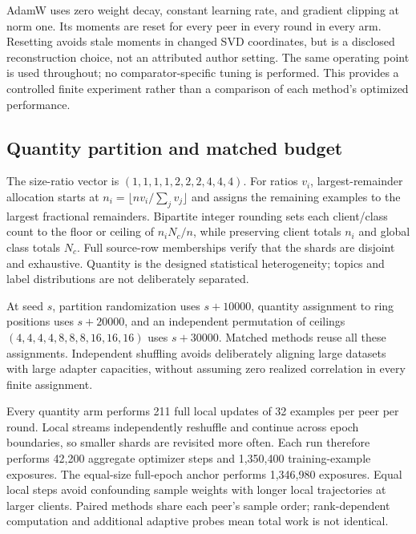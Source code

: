 \documentclass[11pt]{article}
\begin{document}
AdamW uses zero weight decay, constant learning rate, and gradient clipping at norm one. Its moments are reset for every peer in every round in every arm. Resetting avoids stale moments in changed SVD coordinates, but is a disclosed reconstruction choice, not an attributed author setting. The same operating point is used throughout; no comparator-specific tuning is performed. This provides a controlled finite experiment rather than a comparison of each method's optimized performance.

\subsection{Quantity partition and matched budget}
The size-ratio vector is $(1,1,1,1,2,2,2,4,4,4)$. For ratios $v_i$, largest-remainder allocation starts at $n_i=\lfloor nv_i/\sum_jv_j\rfloor$ and assigns the remaining examples to the largest fractional remainders. Bipartite integer rounding sets each client/class count to the floor or ceiling of $n_iN_c/n$, while preserving client totals $n_i$ and global class totals $N_c$. Full source-row memberships verify that the shards are disjoint and exhaustive. Quantity is the designed statistical heterogeneity; topics and label distributions are not deliberately separated.

At seed $s$, partition randomization uses $s+10000$, quantity assignment to ring positions uses $s+20000$, and an independent permutation of ceilings $(4,4,4,4,8,8,8,16,16,16)$ uses $s+30000$. Matched methods reuse all these assignments. Independent shuffling avoids deliberately aligning large datasets with large adapter capacities, without assuming zero realized correlation in every finite assignment.

Every quantity arm performs 211 full local updates of 32 examples per peer per round. Local streams independently reshuffle and continue across epoch boundaries, so smaller shards are revisited more often. Each run therefore performs 42,200 aggregate optimizer steps and 1,350,400 training-example exposures. The equal-size full-epoch anchor performs 1,346,980 exposures. Equal local steps avoid confounding sample weights with longer local trajectories at larger clients. Paired methods share each peer's sample order; rank-dependent computation and additional adaptive probes mean total work is not identical.
\end{document}

